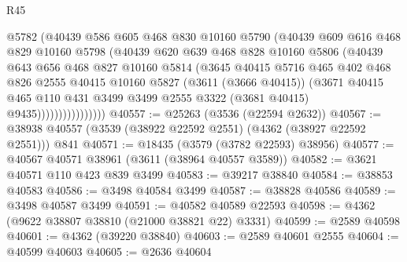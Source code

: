 \begin{lexlean}{R45}
\begin{coremodule}
                        @5782
                        (@40439
                          @586
                          @605
                          @468
                          @830
                          @10160
                          @5790
                          (@40439
                            @609
                            @616
                            @468
                            @829
                            @10160
                            @5798
                            (@40439
                              @620
                              @639
                              @468
                              @828
                              @10160
                              @5806
                              (@40439
                                @643
                                @656
                                @468
                                @827
                                @10160
                                @5814
                                (@3645
                                  @40415
                                  @5716
                                  @465
                                  @402
                                  @468
                                  @826
                                  @2555
                                  @40415
                                  @10160
                                  @5827
                                  (@3611 (@3666 @40415))
                                  (@3671
                                    @40415
                                    @465
                                    @110
                                    @431
                                    @3499
                                    @3499
                                    @2555
                                    @3322
                                    (@3681 @40415)
                                    @9435))))))))))))))))
@40557 := @25263 (@3536 (@22594 @2632))
@40567 := @38938 @40557 (@3539 (@38922 @22592 @2551) (@4362 (@38927 @22592 @2551))) @841
@40571 := @18435 (@3579 (@3782 @22593) @38956)
@40577 := @40567 @40571 @38961 (@3611 (@38964 @40557 @3589))
@40582 := @3621 @40571 @110 @423 @839 @3499
@40583 := @39217 @38840
@40584 := @38853 @40583
@40586 := @3498 @40584 @3499
@40587 := @38828 @40586
@40589 := @3498 @40587 @3499
@40591 := @40582 @40589 @22593
@40598 := @4362 (@9622 @38807 @38810 (@21000 @38821 @22) @3331)
@40599 := @2589 @40598
@40601 := @4362 (@39220 @38840)
@40603 := @2589 @40601 @2555
@40604 := @40599 @40603
@40605 := @2636 @40604

\end{coremodule}
\end{lexlean}
